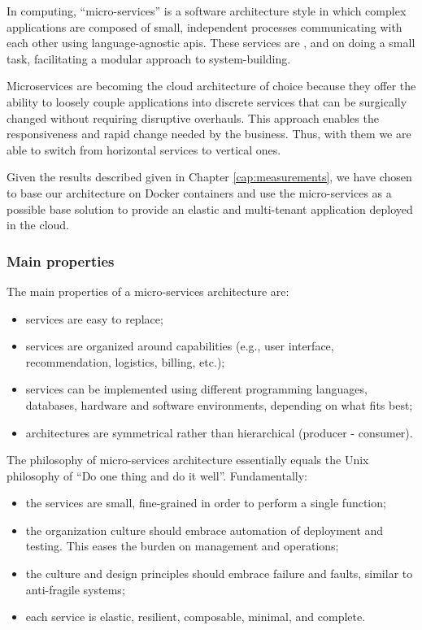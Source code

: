 In computing, ``micro-services'' is a software architecture style in which complex applications are
composed of small, independent processes communicating with each other using language-agnostic 
\acs{api}s. These services are ,  and 
 on doing a small task, facilitating a modular approach to system-building.

Microservices are becoming the cloud architecture of choice because they offer the ability to 
loosely couple applications into discrete services that can be surgically changed without requiring
disruptive overhauls. This approach enables the responsiveness and rapid change needed by the business.
Thus, with them we are able to switch from horizontal services to vertical ones.

Given the results described given in Chapter \ref{cap:measurements}, we have chosen to base our
architecture on Docker containers and use the micro-services as a possible base solution to provide an
elastic and multi-tenant application deployed in the cloud.

\subsubsection{Main properties}
\label{sec:architecture-soaRevisitation-microServices-properties}
The main properties of a micro-services architecture are:

\begin{itemize}
	\item{services are easy to replace;}
	\item{services are organized around capabilities (e.g., user interface, recommendation,
		logistics, billing, etc.);}
	\item{services can be implemented using different programming languages, databases, hardware and
			software environments, depending on what fits best;}
	\item{architectures are symmetrical rather than hierarchical (producer - consumer).}
\end{itemize}
			
The philosophy of micro-services architecture essentially equals the Unix philosophy of ``Do one thing and do
it well''. Fundamentally:
			
\begin{itemize}
	\item{the services are small, fine-grained in order to perform a single function;}
	\item{the organization culture should embrace automation of deployment and testing. This eases the burden
		on management and operations;}
	\item{the culture and design principles should embrace failure and faults, similar to anti-fragile systems;}
	\item{each service is elastic, resilient, composable, minimal, and complete.}
\end{itemize}

